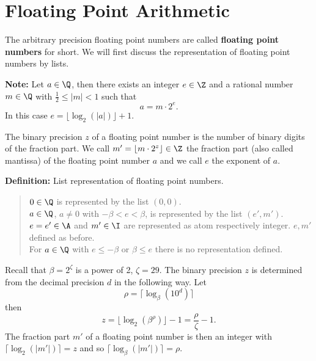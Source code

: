 
\section{Floating Point Arithmetic}

The arbitrary precision floating point numbers are 
called {\bf floating point numbers} for short.
We will first discuss the representation 
of floating point numbers by lists.

{\bf Note:} 
Let $a \in \Q$, then there 
exists an integer $e \in \Z$ and 
a rational number $m \in \Q$ 
with $\frac{1}{2} \leq \vert m \vert < 1$
such that
\begin{displaymath} 
       a = m \cdot 2^e.
\end{displaymath} 
In this case $e = \lfloor \log_2( \vert a \vert ) \rfloor + 1$.

The binary precision $z$ of a floating point number is
the number of binary digits of the fraction part.
We call $m' = \lfloor m \cdot 2^z \rfloor \in \Z$
the fraction part (also called mantissa) of the floating point 
number $a$ and we call $e$ the exponent of $a$.

{\bf Definition:} List representation of floating point numbers.
\begin{quote}
       $0 \in \Q$ is represented by the list $(0,0)$.
       \\
       $a \in \Q$, $a \neq 0$ with $-\beta < e < \beta$, 
       is represented by the list $(e',m')$. 
       $e = e' \in \A$ and $m' \in \I$ are 
       represented as atom respectively integer.  
       $e, m'$ defined as before.  
       \\
       For $a \in \Q$ with $e \leq -\beta$ or $\beta \leq e$ 
       there is no representation defined.
\end{quote}

Recall that $\beta = 2^{\zeta}$ is a power of 2, $\zeta = 29$.
The binary precision $z$ is determined from the 
decimal precision $d$ in the following way. 
Let 
\begin{displaymath}
    \rho = \lceil \log_{\beta}(10^d) \rceil 
\end{displaymath}
then 
\begin{displaymath}
    z = \lfloor \log_2(\beta^\rho) \rfloor - 1 
      = \frac{\rho}{\zeta} - 1.
\end{displaymath}
The fraction part $m'$ of a floating point number
is then an integer with 
$\lceil \log_2( \vert m' \vert ) \rceil = z$ and 
so $\lceil \log_{\beta}( \vert m' \vert ) \rceil = \rho$. 

